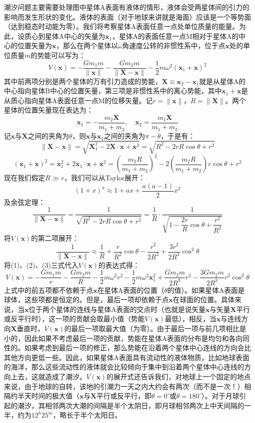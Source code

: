 \documentclass[a4paper,openany]{book}
\begin{document}
潮汐问题主要需要处理图中星体A表面有液体的情形，液体会受两星体间的引力的影响而发生形状的变化。液体的表面（对于地球来讲就是海面）应该是一个等势面（达到稳态时动能为零）。我们将考察星体A表面任意一点处单位质量的能量。为此，设质心到星体A中心的矢量为$\bm{x}_1$，星体A的表面任意一点M相对于星体A的中心的位置矢量为$\bm{x}$，那么在两个星体以$\omega$角速度公转的非惯性系中，位于点$\bm{x}$处的单位质量$m$的势能可以写为：
\[
    V(\bm{x}) = -\frac{Gm_1 m}{\|\bm{x}\|} - \frac{Gm_2 m}{\|\bm{X} - \bm{x}\|} - \frac{1}{2}m\omega^2(\bm{x}_1+\bm{x})^2
\]
其中前两项分别是两个星体的万有引力造成的势能，$\bm{X} \equiv \bm{x}_2-\bm{x}_1$就是从星体A的中心指向星体B中心的位置矢量，第三项是非惯性系中的离心势能，其中$\bm{x}_1+\bm{x}$是从质心指向星体A表面任意一点M的位移矢量。记$r = \|\bm{x}\|$，$R = \|\bm{X}\|$。两个星体的位置矢量现在表达为：
\begin{equation}
    \bm{x}_1 = -\frac{m_2\bm{X}}{m_1+m_2},\quad \bm{x}_2 = \frac{m_1\bm{X}}{m_1+m_2}
\end{equation}
记$\bm{x}$与$\bm{X}$之间的夹角为$\theta$，则$\bm{x}$与$\bm{x}_1$之间的夹角为$\pi - \theta$，于是有：
\[
    \|\bm{X}-\bm{x}\| = \sqrt{\bm{X}_1^2 - 2\bm{X} \cdot \bm{x} + \bm{x}^2} = \sqrt{R^2 - 2rR\cos\theta + r^2}
\]
\[
    (\bm{x}_1 + \bm{x})^2 = \bm{x}_1^2 + 2\bm{x}_1 \cdot \bm{x} + \bm{x}^2 = \left(\frac{m_2 R}{m_1+m_2}\right)^2 - 2\left(\frac{m_2 R}{m_1+m_2}\right)r\cos\theta + r^2
\]
现在我们假定$R \gg r$，我们可以从Taylor展开：
\[
        (1+x)^a \approx 1 + ax + \frac{a(a-1)}{2}x^2
\]
及余弦定理：
\[
    \frac{1}{\|\bm{X}-\bm{x}\|} = \frac{1}{\sqrt{R^2 - 2rR\cos\theta + r^2}} = \frac{1}{R} \cdot \frac{1}{\sqrt{1-\dfrac{2r}{R}\cos\theta+\dfrac{r^2}{R^2}}}
\]
将$V(\bm{x})$的第二项展开：
\begin{equation}
    \frac{1}{\|\bm{X}-\bm{x}\|} \approx \frac{1}{R} + \frac{r}{R^2}\cos\theta - \frac{r^2}{2R^3} + \frac{3r^2}{2R^3}\cos^2\theta
\end{equation}
将(1)、(2)、(3)三式代入$V(\bm{x})$的表达式得：
\[
    \boxed{V(\bm{x}) = -\frac{Gm_1 m}{r} - \frac{Gm_2 m}{R} - \frac{1}{2}m\omega^2 r^2 - \frac{1}{2}m \omega^2\bm{x}_1^2 + \frac{Gm_2 m}{2R^3}r^2 - \frac{3Gm_2 m}{2R^3}r^2\cos^2\theta}
\]
上式中的前五项都不依赖于点$\bm{x}$在星体A表面的位置（$\theta$的值）。如果星体A表面是球体，这些项都是恒定的。但是，最后一项却依赖于点$\bm{x}$在球面的位置。具体来说，当$\bm{x}$位于两个星体的连线与星体A表面的交点时（也就是说矢量$\bm{x}$与矢量$\bm{X}$平行或反平行时），这一项的贡献会取最小值（势能$V(\bm{x})$最低），相反，当$\bm{x}$与连线方向$\bm{X}$垂直时，$V(\bm{x})$的最后一项取最大值（为零）。由于最后一项与前几项相比是小的，因此如果不考虑最后一项的贡献，势能在星体A表面的分布是均匀和各向同性的。如果考虑到最后一项的修正，那么势能在沿着两个星体中心连线的方向会比其他方向更低一些。因此，如果星体A表面具有流动性的液体物质，比如地球表面的海洋，那么这些流动性的液体就会比较倾向于集中到沿着两个星体中心连线的方向上去，这就造成了潮汐。$V(\bm{x})$的展开式还告诉我们，对地球上一个固定的地点来说，由于地球的自转，该地的引潮力一天之内大约会有两次（而不是一次！）相隔约半天时间的极大值（$\bm{x}$与$\bm{X}$平行或反平行，即$\theta=0^\circ$或$\theta=180^\circ$）。对于月球引起的潮汐，其相邻两次大潮的间隔是半个太阴日，即月球相邻两次上中天间隔的一半，约为$12^h 25^m$，略长于半个太阳日。
\end{document}
